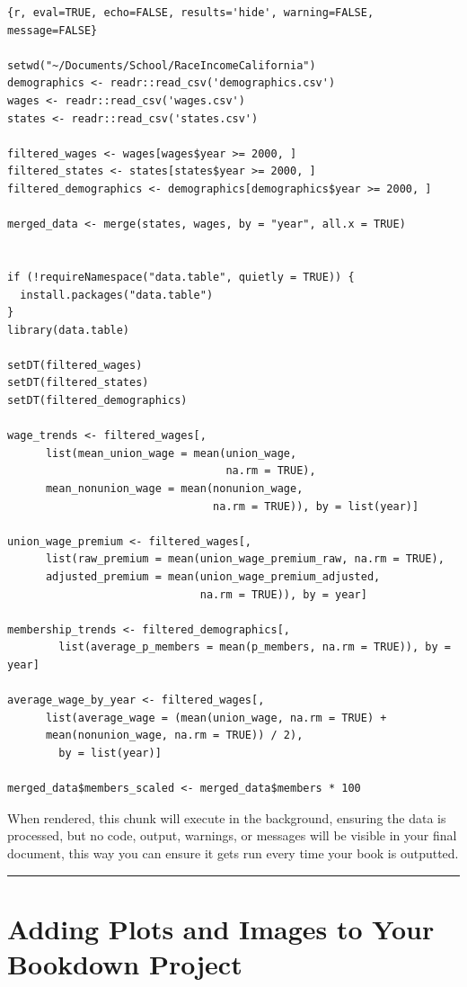 \documentclass[
]{book}
\theoremstyle{definition}
\theoremstyle{definition}
\theoremstyle{definition}
\theoremstyle{definition}
\theoremstyle{remark}
\begin{document}
\begin{verbatim}
{r, eval=TRUE, echo=FALSE, results='hide', warning=FALSE, message=FALSE}

setwd("~/Documents/School/RaceIncomeCalifornia")
demographics <- readr::read_csv('demographics.csv')
wages <- readr::read_csv('wages.csv')
states <- readr::read_csv('states.csv')

filtered_wages <- wages[wages$year >= 2000, ]
filtered_states <- states[states$year >= 2000, ]
filtered_demographics <- demographics[demographics$year >= 2000, ]

merged_data <- merge(states, wages, by = "year", all.x = TRUE)


if (!requireNamespace("data.table", quietly = TRUE)) {
  install.packages("data.table")
}
library(data.table)

setDT(filtered_wages)
setDT(filtered_states)
setDT(filtered_demographics)

wage_trends <- filtered_wages[, 
      list(mean_union_wage = mean(union_wage, 
                                  na.rm = TRUE),
      mean_nonunion_wage = mean(nonunion_wage, 
                                na.rm = TRUE)), by = list(year)]

union_wage_premium <- filtered_wages[, 
      list(raw_premium = mean(union_wage_premium_raw, na.rm = TRUE),
      adjusted_premium = mean(union_wage_premium_adjusted, 
                              na.rm = TRUE)), by = year]

membership_trends <- filtered_demographics[, 
        list(average_p_members = mean(p_members, na.rm = TRUE)), by = year]

average_wage_by_year <- filtered_wages[,
      list(average_wage = (mean(union_wage, na.rm = TRUE) + 
      mean(nonunion_wage, na.rm = TRUE)) / 2), 
        by = list(year)]

merged_data$members_scaled <- merged_data$members * 100
\end{verbatim}

When rendered, this chunk will execute in the background, ensuring the data is processed, but no code, output, warnings, or messages will be visible in your final document, this way you can ensure it gets run every time your book is outputted.

\begin{center}\rule{0.5\linewidth}{0.5pt}\end{center}

\section{Adding Plots and Images to Your Bookdown Project}\label{adding-plots-and-images-to-your-bookdown-project}
\end{document}
